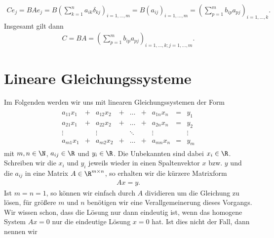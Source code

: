 \documentclass[letterpaper,10pt,english]{jupyterBook}
\begin{document}
\begin{equation*}
\begin{split} C e_j = BAe_j = B (\sum_{k=1}^n a_{ik} \delta_{kj})_{i=1,\ldots,m} = B (a_{ij})_{i=1,\ldots,m} = (\sum_{p=1}^m b_{ip} a_{pj})_{i=1,\ldots,k}.\end{split}
\end{equation*}
Insgesamt gilt dann
\begin{equation*}
\begin{split} C = BA =  (\sum_{p=1}^m b_{ip} a_{pj})_{i=1,\ldots,k; j=1,\ldots,m} .\end{split}
\end{equation*}

\section{Lineare Gleichungssysteme}
\label{\detokenize{vektorraeume/LGS:lineare-gleichungssysteme}}\label{\detokenize{vektorraeume/LGS::doc}}
Im Folgenden werden wir uns mit linearen Gleichungssystemen der Form
\begin{equation*}
\begin{split}\begin{matrix}
a_{11} x_1 &+& a_{12}x_2 &+& \ldots &+& a_{1n}x_n &=& y_1 \\
a_{21} x_1 &+& a_{22}x_2 &+& \ldots &+& a_{2n}x_n &=& y_2 \\
\vdots &&  \vdots && \ddots && \vdots && \vdots \\
a_{m1} x_1 &+& a_{m2}x_2 &+& \ldots &+& a_{mn}x_n &=& y_m
\end{matrix}\end{split}
\end{equation*}
mit \(m,n \in \N\), \(a_{ij} \in \R\) und \(y_i \in \R\). Die Unbekannten sind dabei \(x_i \in \R\). Schreiben wir die \(x_i\) und \(y_i\) jeweils wieder in einen Spaltenvektor \(x\) bzw. \(y\) und die \(a_{ij}\) in eine Matrix \(A \in \R^{m \times n}\), so erhalten wir die kürzere Matrixform
\begin{equation*}
\begin{split} A x = y .\end{split}
\end{equation*}
Ist \(m=n=1\), so können wir einfach durch \(A\) dividieren um die Gleichung zu lösen, für größere \(m\) und \(n\) benötigen wir eine Verallgemeinerung dieses Vorgangs.
Wir wissen schon, dass die Lösung nur dann eindeutig ist, wenn das homogene System \(A x = 0\) nur die eindeutige Lösung \(x=0\) hat. Ist dies nicht der Fall, dann nennen wir
\end{document}
